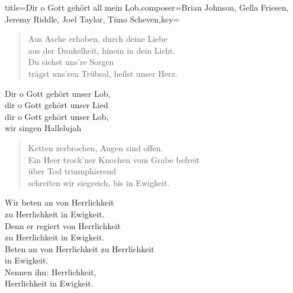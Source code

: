 \documentclass[]{leadsheet}
\begin{document}
\begin{song}{title={Dir o Gott gehört all mein Lob},composer={Brian Johnson, Gella Friesen, Jeremy Riddle, Joel Taylor, Timo Scheven},key={}}

\begin{verse}
Aus Asche erhoben, durch deine Liebe \\
aus der Dunkelheit, hinein in dein Licht. \\
Du siehst uns're Sorgen \\
trägst uns'ren Trübsal, heilst unser Herz. \\
\end{verse}

\begin{chorus}
Dir o Gott gehört unser Lob, \\
dir o Gott gehört unser Lied \\
dir o Gott gehört unser Lob, \\
wir singen Hallelujah \\
\end{chorus}

\begin{verse}
Ketten zerbrochen, Augen sind offen. \\
Ein Heer trock'ner Knochen vom Grabe befreit \\
über Tod triumphierend \\
schreiten wir siegreich, bis in Ewigkeit. \\
\end{verse}

\begin{bridge}
Wir beten an von Herrlichkeit \\
zu Herrlichkeit in Ewigkeit. \\
Denn er regiert von Herrlichkeit \\
zu Herrlichkeit in Ewigkeit. \\
Beten an von Herrlichkeit zu Herrlichkeit \\
in Ewigkeit. \\
Nennen ihn: Herrlichkeit, \\
Herrlichkeit in Ewigkeit. \\
\end{bridge}

\end{song}
\end{document}
